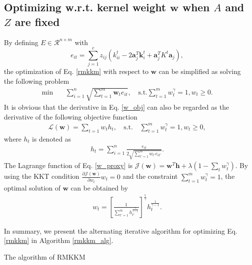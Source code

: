 \documentclass{article}
\newcommand{\st}{\mathrm{s.t.}}
\begin{document}
\subsection{Optimizing w.r.t. kernel weight $\bm{w}$ when $A$ and $Z$ are fixed}
By defining $E \in \mathcal{R}^{n \times m}$ with
\begin{equation}
    e_{it} = \sum_{j=1}^{c} z_{ij} ( k_{ii}^{t} - 2 \bm{a}_j^T \bm{k}_i^t + \bm{a}_j^T K^t \bm{a}_j ),
\end{equation}
the optimization of Eq. \eqref{rmkkm} with respect to $\bm{w}$ can be simplified as solving the following problem
\begin{align}\label{w_obj}
	\min  \quad & \sum_{i=1}^{n} \sqrt{\sum_{t=1}^{m} \bm{w}_t e_{it}}, \quad \st \sum_{t=1}^{m} w_t^{\gamma} = 1, w_t \geq 0.
\end{align}
It is obvious that the derivative in Eq. \eqref{w_obj} can also be regarded as the derivative of the following objective function
\begin{align}\label{w_proxy}
\mathcal{L}(\bm{w}) = \sum_{t=1} w_t h_t ,\quad \st \quad \sum_{t=1}^{m} w_t^{\gamma} = 1, w_t \geq 0,
\end{align}
where $h_t$ is denoted as
\begin{align}\label{w_grad}
h_t =\sum_{i=1}^{n} \frac{e_{it}}{2 \sqrt{\sum_{t'=1}^{m} w_{t'} e_{it'}} }.
\end{align}
The Lagrange function of Eq. \eqref{w_proxy} is $\mathcal{J}(\bm{w}) = \bm{w}^T \bm{h} + \lambda (1 - \sum_{t}w_t^{\gamma})$.
By using the KKT condition $\frac{\partial \mathcal{J}(\bm{w})}{\partial w_t} w_ t= 0$ and the constraint $\sum_{t=1}^{m} w_t^{\gamma} = 1$, the optimal solution of $\bm{w}$ can be obtained by
\begin{align}\label{update_w}
  w_t = \left[ \frac{1}{\sum_{t'=1}^{m} h_{t'}^{\frac{\gamma}{\gamma - 1}}}\right]^\frac{1}{\gamma} h_{t}^{\frac{1}{\gamma -1}}.
\end{align}

In summary, we present the alternating iterative algorithm for optimizing Eq. \eqref{rmkkm} in Algorithm \ref{rmkkm_alg}.
\begin{algorithm}
    \caption{The algorithm of RMKKM}
	\label{rmkkm_alg}
	\begin{algorithmic}
	\REPEAT
	\end{algorithmic}
  \end{algorithm}
\end{document}
